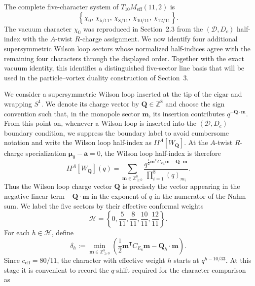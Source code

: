 \documentclass[11pt,a4paper]{article}
\numberwithin{equation}{section}
\begin{document}
The complete five-character system of $T_{10}M_{\mathrm{eff}}(11,2)$ is
\[
  \left\{
  \chi_0,\,
  \chi_{5/11},\,
  \chi_{8/11},\,
  \chi_{10/11},\,
  \chi_{12/11}
  \right\}.
\]
The vacuum character $\chi_0$ was reproduced in Section~2.3 from the $(\mathcal D,D_c)$ half-index with the $A$-twist $R$-charge assignment.  We now identify four additional supersymmetric Wilson loop sectors whose normalized half-indices agree with the remaining four characters through the displayed order.  Together with the exact vacuum identity, this identifies a distinguished five-sector line basis that will be used in the particle--vortex duality construction of Section~3.

We consider a supersymmetric Wilson loop inserted at the tip of the cigar and wrapping $S^1$.  We denote its charge vector by $\boldsymbol Q\in\mathbb Z^8$ and choose the sign convention such that, in the monopole sector $\boldsymbol m$, its insertion contributes $q^{-\boldsymbol Q\cdot\boldsymbol m}$.  From this point on, whenever a Wilson loop is inserted into the $(\mathcal D,D_c)$ boundary condition, we suppress the boundary label to avoid cumbersome notation and write the Wilson loop half-index as $I\!\!I^{A}[W_{\boldsymbol Q}]$.  At the $A$-twist $R$-charge specialization $\boldsymbol\mu_0-\boldsymbol a=0$, the Wilson loop half-index is therefore
\begin{equation}
  I\!\!I^{A}[W_{\boldsymbol Q}](q)
  =\sum_{\boldsymbol m\in\mathbb Z_{\geq0}^{8}}
  \frac{
  q^{\frac12\boldsymbol m^{\mathsf T}C_{E_8}\boldsymbol m
  -\boldsymbol Q\cdot\boldsymbol m}
  }{
  \prod_{i=1}^{8}(q)_{m_i}
  }.
  \label{eq:Wilson-half-index}
\end{equation}
Thus the Wilson loop charge vector $\boldsymbol Q$ is precisely the vector appearing in the negative linear term $-\boldsymbol Q\cdot\boldsymbol m$ in the exponent of $q$ in the numerator of the Nahm sum.  We label the five sectors by their effective conformal weights
\begin{equation}
  \mathcal H
  =\left\{0,\frac5{11},\frac8{11},\frac{10}{11},\frac{12}{11}\right\}.
  \label{eq:five-weight-set}
\end{equation}
For each $h\in\mathcal H$, define
\begin{equation}
  \delta_h
  :=\min_{\boldsymbol m\in\mathbb Z_{\geq0}^{8}}
  \left(
  \frac12\boldsymbol m^{\mathsf T}C_{E_8}\boldsymbol m
  -\boldsymbol Q_h\cdot\boldsymbol m
  \right).
  \label{eq:Wilson-minimum}
\end{equation}
Since $c_{\mathrm{eff}}=80/11$, the character with effective weight $h$ starts at $q^{h-10/33}$.  At this stage it is convenient to record the $q$-shift required for the character comparison as
\end{document}
